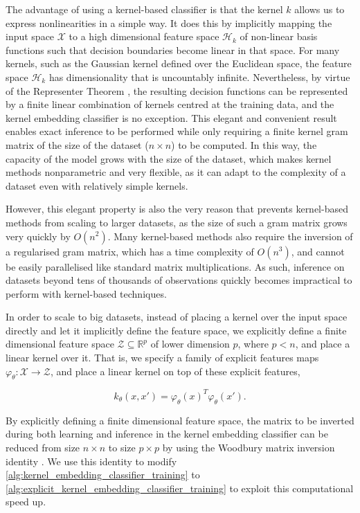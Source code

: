 \documentclass{article}
\begin{document}
		The advantage of using a kernel-based classifier is that the kernel $k$ allows us to express nonlinearities in a simple way. It does this by implicitly mapping the input space $\mathcal{X}$ to a high dimensional feature space $\mathcal{H}_{k}$ of non-linear basis functions such that decision boundaries become linear in that space. For many kernels, such as the Gaussian kernel defined over the Euclidean space, the feature space $\mathcal{H}_{k}$ has dimensionality that is uncountably infinite. Nevertheless, by virtue of the Representer Theorem \citep{kimeldorf1971some}, the resulting decision functions can be represented by a finite linear combination of kernels centred at the training data, and the kernel embedding classifier is no exception. This elegant and convenient result enables exact inference to be performed while only requiring a finite kernel gram matrix of the size of the dataset ($n \times n$) to be computed. In this way, the capacity of the model grows with the size of the dataset, which makes kernel methods nonparametric and very flexible, as it can adapt to the complexity of a dataset even with relatively simple kernels. 
		
		However, this elegant property is also the very reason that prevents kernel-based methods from scaling to larger datasets, as the size of such a gram matrix grows very quickly by $O(n^{2})$. Many kernel-based methods also require the inversion of a regularised gram matrix, which has a time complexity of $O(n^{3})$, and cannot be easily parallelised like standard matrix multiplications. As such, inference on datasets beyond tens of thousands of observations quickly becomes impractical to perform with kernel-based techniques.
		
		In order to scale to big datasets, instead of placing a kernel over the input space directly and let it implicitly define the feature space, we explicitly define a finite dimensional feature space $\mathcal{Z} \subseteq \mathbb{R}^{p}$ of lower dimension $p$, where $p < n$, and place a linear kernel over it. That is, we specify a family of explicit features maps $\varphi_{\theta} : \mathcal{X} \to \mathcal{Z}$, and place a linear kernel on top of these explicit features,
		
		\begin{equation}
			k_{\theta}(x, x') = \varphi_{\theta}(x)^{T} \varphi_{\theta}(x').
		\end{equation}
		
		By explicitly defining a finite dimensional feature space, the matrix to be inverted during both learning and inference in the kernel embedding classifier can be reduced from size $n \times n$ to size $p \times p$ by using the Woodbury matrix inversion identity \citep{higham2002accuracy}. We use this identity to modify \cref{alg:kernel_embedding_classifier_training} to \cref{alg:explicit_kernel_embedding_classifier_training} to exploit this computational speed up.
		
\end{document}
